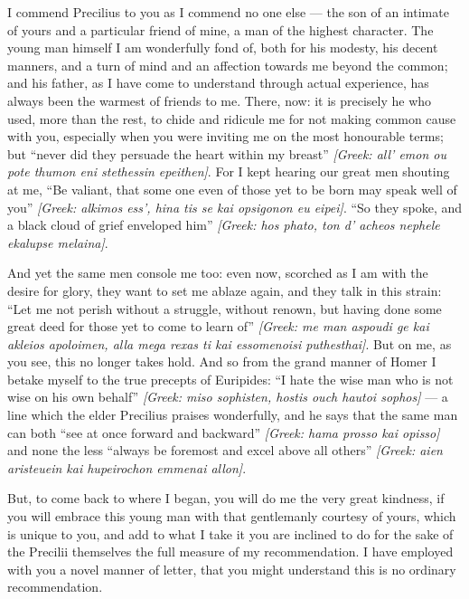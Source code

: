 

 I commend Precilius to you as I commend no one else --- the son of an intimate of yours and a particular friend of mine, a man of the highest character. The young man himself I am wonderfully fond of, both for his modesty, his decent manners, and a turn of mind and an affection towards me beyond the common; and his father, as I have come to understand through actual experience, has always been the warmest of friends to me. There, now: it is precisely he who used, more than the rest, to chide and ridicule me for not making common cause with you, especially when you were inviting me on the most honourable terms; but ``never did they persuade the heart within my breast'' \textit{[Greek: all' emon ou pote thumon eni stethessin epeithen]}. For I kept hearing our great men shouting at me, ``Be valiant, that some one even of those yet to be born may speak well of you'' \textit{[Greek: alkimos ess', hina tis se kai opsigonon eu eipei]}. ``So they spoke, and a black cloud of grief enveloped him'' \textit{[Greek: hos phato, ton d' acheos nephele ekalupse melaina]}.

 And yet the same men console me too: even now, scorched as I am with the desire for glory, they want to set me ablaze again, and they talk in this strain: ``Let me not perish without a struggle, without renown, but having done some great deed for those yet to come to learn of'' \textit{[Greek: me man aspoudi ge kai akleios apoloimen, alla mega rexas ti kai essomenoisi puthesthai]}. But on me, as you see, this no longer takes hold. And so from the grand manner of Homer I betake myself to the true precepts of Euripides: ``I hate the wise man who is not wise on his own behalf'' \textit{[Greek: miso sophisten, hostis ouch hautoi sophos]} --- a line which the elder Precilius praises wonderfully, and he says that the same man can both ``see at once forward and backward'' \textit{[Greek: hama prosso kai opisso]} and none the less ``always be foremost and excel above all others'' \textit{[Greek: aien aristeuein kai hupeirochon emmenai allon]}.

 But, to come back to where I began, you will do me the very great kindness, if you will embrace this young man with that gentlemanly courtesy of yours, which is unique to you, and add to what I take it you are inclined to do for the sake of the Precilii themselves the full measure of my recommendation. I have employed with you a novel manner of letter, that you might understand this is no ordinary recommendation.
